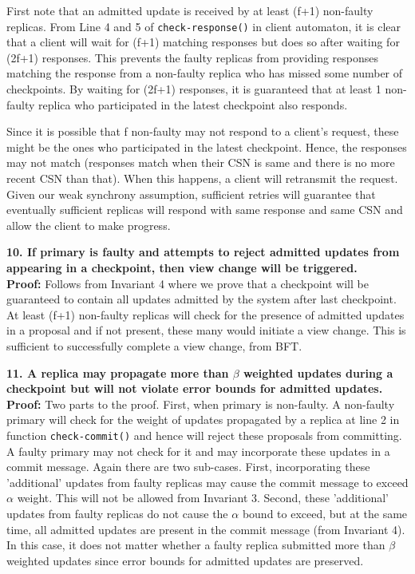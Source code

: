 \documentclass[twocolumn,10pt]{article}
\begin{document}
{First note that an admitted update is received by at least (f+1) non-faulty
replicas. From Line 4 and 5 of \texttt{check-response()} in client automaton,
it is clear that a client will wait for (f+1) matching responses but does so after
waiting for (2f+1) responses. This prevents the faulty replicas from providing responses
matching the response from a non-faulty replica who has missed some number of 
checkpoints. By waiting for (2f+1) responses, it is guaranteed that at least 1 non-faulty
replica who participated in the latest checkpoint also responds.  

Since it is possible that f non-faulty may not respond to a client's request,
these might be the ones who participated in the latest checkpoint. Hence, the 
responses may not match (responses match when their CSN is same and there is no more
recent CSN than that). When this happens, a client will retransmit the
request. Given our weak synchrony assumption, sufficient retries will guarantee
that eventually sufficient replicas will respond with same response and same CSN 
and allow the client to make progress.

\textbf{10. If primary is faulty and attempts to reject admitted updates from appearing
in a checkpoint, then view change will be triggered.}\\
\textbf{Proof:} Follows from Invariant 4 where we prove that a checkpoint will
be guaranteed to contain all updates admitted by the system after last checkpoint. At least
(f+1) non-faulty replicas will check for the presence of admitted updates in a proposal and
if not present, these many would initiate a view change. This is sufficient to successfully
complete a view change, from BFT.

\textbf{11. A replica may propagate more than $\beta$ weighted updates during 
a checkpoint but will not violate error bounds for admitted updates.}\\
\textbf{Proof:} Two parts to the proof. First, when primary is non-faulty.
A non-faulty primary will check for the weight of updates propagated by 
a replica at line 2 in function \texttt{check-commit()} and hence will
reject these proposals from committing. A faulty
primary may not check for it and may incorporate these updates in a 
commit message. Again there are two sub-cases. First, incorporating these
'additional' updates from faulty replicas may cause the commit message to 
exceed $\alpha$ weight. This will not be allowed from Invariant 3. Second,
these 'additional' updates from faulty replicas do not cause the $\alpha$
bound to exceed, but at the same time, all admitted updates are present
in the commit message (from Invariant 4). In this case, it does not 
matter whether a faulty replica submitted more than $\beta$ weighted updates
since error bounds for admitted updates are preserved.

}
\end{document}
